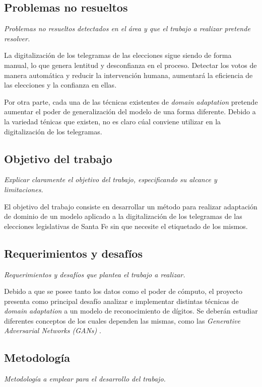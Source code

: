 \documentclass[a4paper, twoside]{report}
\begin{document}
\subsection*{Problemas no resueltos}
{\it Problemas no resueltos detectados en el área y que el trabajo a realizar
	pretende resolver.}

La digitalizaci\'on de los telegramas de las elecciones sigue siendo de forma
manual, lo que genera lentitud y desconfianza en el proceso. Detectar los votos
de manera autom\'atica y reducir la intervenci\'on humana, aumentar\'a la
eficiencia de las elecciones y la confianza en ellas.

Por otra parte, cada una de las t\'ecnicas existentes de {\it domain
		adaptation} pretende aumentar el poder de generalizaci\'on del modelo de una
forma diferente. Debido a la variedad t\'enicas que existen, no es claro c\'ual
conviene utilizar en la digitalizaci\'on de los telegramas.

\subsection*{Objetivo del trabajo}
{\it Explicar claramente el objetivo del trabajo, especificando su alcance y limitaciones.}

El objetivo del trabajo consiste en desarrollar un m\'etodo para realizar
adaptaci\'on de dominio de un modelo aplicado a la digitalizaci\'on de los
telegramas de las elecciones legislativas de Santa Fe sin que necesite el
etiquetado de los mismos.

\subsection*{Requerimientos y desafíos}
{\it Requerimientos y desafíos que plantea el trabajo a realizar.}

Debido a que se posee tanto los datos como el poder de c\'omputo, el proyecto
presenta como principal desaf\'io analizar e implementar distintas t\'ecnicas
de {\it domain adaptation} a un modelo de reconocimiento de d\'igitos. Se
deber\'an estudiar diferentes conceptos de los cuales dependen las mismas, como
las {\it Generative Adversarial Networks (GANs)}
\cite{Tzeng_2017,ganin2016domain}.

\subsection*{Metodología}
{\it Metodología a emplear para el desarrollo del trabajo.}
\end{document}
